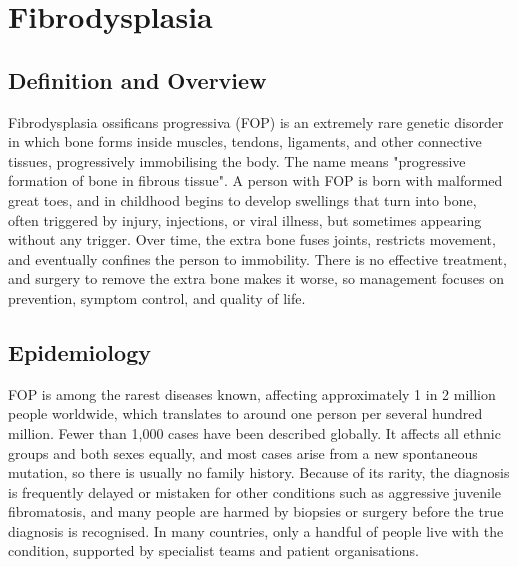 \chapter{Fibrodysplasia}

\section*{Definition and Overview}
Fibrodysplasia ossificans progressiva (FOP) is an extremely rare genetic disorder in which bone forms inside muscles, tendons, ligaments, and other connective tissues, progressively immobilising the body. The name means "progressive formation of bone in fibrous tissue". A person with FOP is born with malformed great toes, and in childhood begins to develop swellings that turn into bone, often triggered by injury, injections, or viral illness, but sometimes appearing without any trigger. Over time, the extra bone fuses joints, restricts movement, and eventually confines the person to immobility. There is no effective treatment, and surgery to remove the extra bone makes it worse, so management focuses on prevention, symptom control, and quality of life.

\section*{Epidemiology}
FOP is among the rarest diseases known, affecting approximately 1 in 2 million people worldwide, which translates to around one person per several hundred million. Fewer than 1,000 cases have been described globally. It affects all ethnic groups and both sexes equally, and most cases arise from a new spontaneous mutation, so there is usually no family history. Because of its rarity, the diagnosis is frequently delayed or mistaken for other conditions such as aggressive juvenile fibromatosis, and many people are harmed by biopsies or surgery before the true diagnosis is recognised. In many countries, only a handful of people live with the condition, supported by specialist teams and patient organisations.

